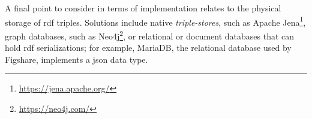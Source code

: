 A final point to consider in terms of implementation relates to the physical storage of \gls{rdf} triples. Solutions include native \emph{triple-stores}, such as Apache Jena\footnote{\url{https://jena.apache.org/}}, graph databases, such as Neo4j\footnote{\url{https://neo4j.com/}}, or relational or document databases that can hold \gls{rdf} serializations; for example, MariaDB, the relational database used by Figshare, implements a \gls{json} data type\cite{mariadb}.

